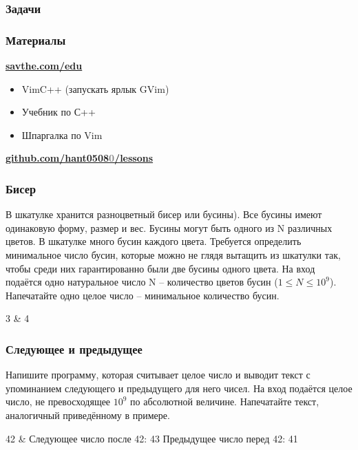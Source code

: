 \begin{frame}
	\frametitle{Задачи}
\end{frame}

\begin{frame}
	\frametitle{Материалы}
	{\bf \href{http://savthe.com/edu}{savthe.com/edu}}
	\begin{itemize}
		\item	VimC++ (запускать ярлык GVim) 
		\item	Учебник по С++ 
		\item	Шпаргалка по Vim 
	\end{itemize}
	{\bf \href{https://github.com/hant05080/lessons}{github.com/hant0508\textcolor{gray}0/lessons}}
\end{frame}

\begin{frame}
	\frametitle{Бисер}
	В шкатулке хранится разноцветный бисер или бусины). Все бусины имеют
	одинаковую форму, размер и вес. Бусины могут быть одного из N различных
	цветов. В шкатулке много бусин каждого цвета.  Требуется определить
	минимальное число бусин, которые можно не глядя вытащить из шкатулки так,
	чтобы среди них гарантированно были две бусины одного цвета. 
	\inp
	На вход подаётся одно натуральное число N -- количество цветов бусин ($1 \leq N \leq 10^9$). 
	\out
	Напечатайте одно целое число -- минимальное количество бусин.
	\begin{ex}
	3 & 4 \tb
	\end{ex}
\end{frame}

\begin{frame}
	\frametitle{Следующее и предыдущее}
	Напишите программу, которая считывает целое число и выводит текст с
	упоминанием следующего и предыдущего для него чисел. 
	\inp
	На вход подаётся целое число, не превосходящее $10^9$ по абсолютной величине.
	\out
	Напечатайте текст, аналогичный приведённому в примере.
	\begin{ex}
	42 & Следующее число после 42: 43 \newline Предыдущее число перед 42: 41 \tb 
	\end{ex}	
\end{frame}


